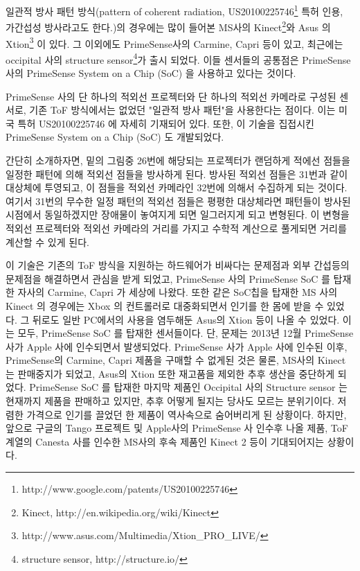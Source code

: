일관적 방사 패턴 방식(pattern of coherent radiation, US20100225746\footnote{http://www.google.com/patents/US20100225746} 특허 인용, 가간섭성 방사라고도 한다.)의 경우에는 많이 들어본 MS사의 Kinect\footnote{Kinect, http://en.wikipedia.org/wiki/Kinect}와 Asus 의 Xtion\footnote{http://www.asus.com/Multimedia/Xtion\_PRO\_LIVE/} 이 있다. 그 이외에도 PrimeSense사의 Carmine, Capri 등이 있고, 최근에는 occipital 사의 structure sensor\footnote{structure sensor, http://structure.io/}가 출시 되었다. 이들 센서들의 공통점은 PrimeSense 사의 PrimeSense System on a Chip (SoC) 을 사용하고 있다는 것이다. 

PrimeSense 사의 단 하나의 적외선 프로젝터와 단 하나의 적외선 카메라로 구성된 센서로, 기존 ToF 방식에서는 없었던 "일관적 방사 패턴"을 사용한다는 점이다. 이는 미국 특허 US20100225746 에 자세히 기재되어 있다. 또한, 이 기술을 집접시킨 PrimeSense System on a Chip (SoC) 도 개발되었다. 

간단히 소개하자면, 밑의 그림중 26번에 해당되는 프로젝터가 랜덤하게 적에선 점들을 일정한 패턴에 의해 적외선 점들을 방사하게 된다. 방사된 적외선 점들은 31번과 같이 대상체에 투영되고, 이 점들을 적외선 카메라인 32번에 의해서 수집하게 되는 것이다. 여기서 31번의 무수한 일정 패턴의 적외선 점들은 평평한 대상체라면 패턴들이 방사된 시점에서 동일하겠지만 장애물이 놓여지게 되면 일그러지게 되고 변형된다. 이 변형을 적외선 프로젝터와 적외선 카메라의 거리를 가지고 수학적 계산으로 풀게되면 거리를 계산할 수 있게 된다.

이 기술은 기존의 ToF 방식을 지원하는 하드웨어가 비싸다는 문제점과 외부 간섭등의 문제점을 해결하면서 관심을 받게 되었고, PrimeSense 사의 PrimeSense SoC 를 탑재한 자사의 Carmine, Capri 가 세상에 나왔다. 또한 같은 SoC칩을 탑재한 MS 사의 Kinect 의 경우에는 Xbox 의 컨트롤러로 대중화되면서 인기를 한 몸에 받을 수 있었다. 그 뒤로도 일반 PC에서의 사용을 염두해둔 Asus의 Xtion 등이 나올 수 있었다. 이는 모두,  PrimeSense SoC 를 탑재한 센서들이다. 단, 문제는 2013년 12월 PrimeSense 사가 Apple 사에 인수되면서 발생되었다. PrimeSense 사가 Apple 사에 인수된 이후, PrimeSense의 Carmine, Capri 제품을 구매할 수 없게된 것은 물론, MS사의 Kinect는 판매중지가 되었고, Asus의 Xtion 또한 재고품을 제외한 추후 생산을 중단하게 되었다. PrimeSense SoC 를 탑재한 마지막 제품인 Occipital 사의 Structure sensor 는 현재까지 제품을 판매하고 있지만, 추후 어떻게 될지는 당사도 모르는 분위기이다. 저렴한 가격으로 인기를 끌었던 한 제품이 역사속으로 숨어버리게 된 상황이다. 하지만, 앞으로 구글의 Tango 프로젝트 및 Apple사의 PrimeSense 사 인수후 나올 제품, ToF 계열의 Canesta 사를 인수한 MS사의 후속 제품인 Kinect 2 등이 기대되어지는 상황이다.

